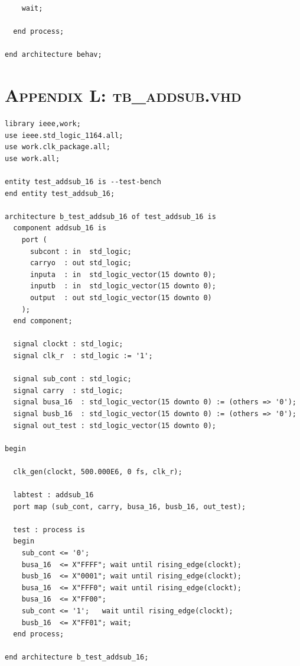 \documentclass[11pt]{report}
\begin{document}
\begin{spacing}{1.5}
\begin{lstlisting}
    wait;

  end process;

end architecture behav;
\end{lstlisting}

\chapter*{\scshape Appendix L: tb\_addsub.vhd}
\label{app:a}
\vspace{15px}
\begin{lstlisting}
library ieee,work;
use ieee.std_logic_1164.all;
use work.clk_package.all;
use work.all;

entity test_addsub_16 is --test-bench
end entity test_addsub_16;

architecture b_test_addsub_16 of test_addsub_16 is
  component addsub_16 is
    port (
      subcont : in  std_logic;
      carryo  : out std_logic;
      inputa  : in  std_logic_vector(15 downto 0);
      inputb  : in  std_logic_vector(15 downto 0);
      output  : out std_logic_vector(15 downto 0)
    );
  end component;

  signal clockt : std_logic;
  signal clk_r  : std_logic := '1';

  signal sub_cont : std_logic;
  signal carry  : std_logic;
  signal busa_16  : std_logic_vector(15 downto 0) := (others => '0');
  signal busb_16  : std_logic_vector(15 downto 0) := (others => '0');
  signal out_test : std_logic_vector(15 downto 0);

begin

  clk_gen(clockt, 500.000E6, 0 fs, clk_r);

  labtest : addsub_16
  port map (sub_cont, carry, busa_16, busb_16, out_test);

  test : process is
  begin
    sub_cont <= '0';
    busa_16  <= X"FFFF"; wait until rising_edge(clockt);
    busb_16  <= X"0001"; wait until rising_edge(clockt);
    busa_16  <= X"FFF0"; wait until rising_edge(clockt);
    busa_16  <= X"FF00";
    sub_cont <= '1';   wait until rising_edge(clockt);
    busb_16  <= X"FF01"; wait;
  end process;

end architecture b_test_addsub_16;
\end{lstlisting}


\end{spacing}
\end{document}
